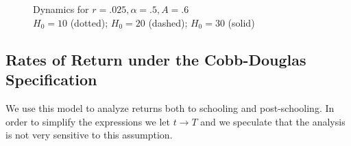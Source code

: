 \begin{figure}[H]
     \begin{center}
    			\caption{Dynamics for $r = .025, \alpha = .5, A = .6$ \\ $H_{0} = 10$ (dotted); $H_{0} = 20$ (dashed); $H_{0} = 30$ (solid)}
        \\
        \\
    \end{center}
\end{figure}

\subsection{Rates of Return under the Cobb-Douglas Specification}
We use this model to analyze returns both to schooling and post-schooling. In order to simplify the expressions we let $t \rightarrow T$ and we speculate that the analysis is not very sensitive to this assumption.

